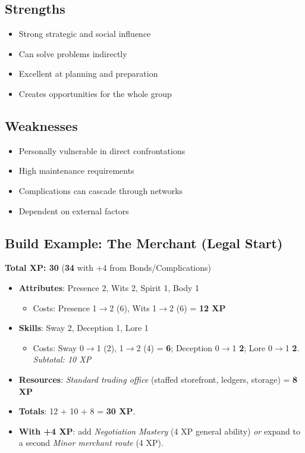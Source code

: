 \begin{multicols}{2}
\subsection*{Strengths}
\begin{itemize}
\item Strong strategic and social influence
\item Can solve problems indirectly
\item Excellent at planning and preparation
\item Creates opportunities for the whole group
\end{itemize}

\subsection*{Weaknesses}
\begin{itemize}
\item Personally vulnerable in direct confrontations
\item High maintenance requirements
\item Complications can cascade through networks
\item Dependent on external factors
\end{itemize}

\subsection*{Build Example: The Merchant (Legal Start)}
\textbf{Total XP: 30} \quad (\textbf{34} with +4 from Bonds/Complications)
\begin{itemize}
\item \textbf{Attributes}: Presence 2, Wits 2, Spirit 1, Body 1
  \begin{itemize}
  \item Costs: Presence 1$\to$2 (6), Wits 1$\to$2 (6) = \textbf{12 XP}
  \end{itemize}
\item \textbf{Skills}: Sway 2, Deception 1, Lore 1
  \begin{itemize}
  \item Costs: Sway 0$\to$1 (2), 1$\to$2 (4) = \textbf{6}; Deception 0$\to$1 \textbf{2}; Lore 0$\to$1 \textbf{2}. \emph{Subtotal: 10 XP}
  \end{itemize}
\item \textbf{Resources}: \emph{Standard trading office} (staffed storefront, ledgers, storage) = \textbf{8 XP}
\item \textbf{Totals}: 12 + 10 + 8 = \textbf{30 XP}.
\item \textbf{With +4 XP}: add \emph{Negotiation Mastery} (4 XP general ability) \emph{or} expand to a second \emph{Minor merchant route} (4 XP).
\end{itemize}


\end{multicols}
